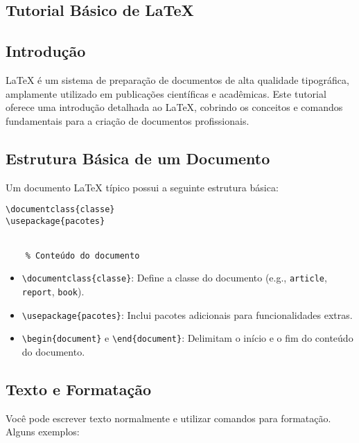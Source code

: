\postextual




\begin{apendicesenv}

\chapter{Tutorial Básico de \LaTeX}

\section*{Introdução}
\LaTeX{} é um sistema de preparação de documentos de alta qualidade tipográfica, amplamente utilizado em publicações científicas e acadêmicas. Este tutorial oferece uma introdução detalhada ao \LaTeX, cobrindo os conceitos e comandos fundamentais para a criação de documentos profissionais.

\section*{Estrutura Básica de um Documento}
Um documento \LaTeX{} típico possui a seguinte estrutura básica:

\begin{verbatim}
\documentclass{classe}
\usepackage{pacotes}


    % Conteúdo do documento

\end{verbatim}

\begin{itemize}
    \item \texttt{\textbackslash documentclass\{classe\}}: Define a classe do documento (e.g., \texttt{article}, \texttt{report}, \texttt{book}).
    \item \texttt{\textbackslash usepackage\{pacotes\}}: Inclui pacotes adicionais para funcionalidades extras.
    \item \texttt{\textbackslash begin\{document\}} e \texttt{\textbackslash end\{document\}}: Delimitam o início e o fim do conteúdo do documento.
\end{itemize}

\section*{Texto e Formatação}
Você pode escrever texto normalmente e utilizar comandos para formatação. Alguns exemplos:


\end{apendicesenv}
